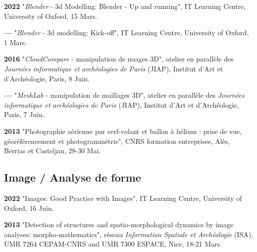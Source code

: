 \documentclass{article}
\newcommand{\fr}[1]{#1}       %
\newcommand{\en}[1]{}     %
\begin{document}
\textbf{2022 }
\fr{"\textit{Blender} - 3d Modelling: Blender - Up and running", IT Learning Centre, University of Oxford, 15 Mars.}
\en{"\textit{Blender} - 3D Modelling: Blender - Up and Running", IT Learning Centre, University of Oxford, March 15.}

\smallbreak
\textbf{--- }
\fr{"\textit{Blender} - 3d modelling: Kick-off", IT Learning Centre, University of Oxford, 1 Mars.}
\en{"\textit{Blender} - 3D Modelling: Kick-off", IT Learning Centre, University of Oxford, March 1.}

\smallbreak
\textbf{2016 }
\fr{"\textit{CloudCompare} - manipulation de nuages 3D", atelier en parallèle des \textit{Journées informatique et archéologies de Paris} (JIAP), Institut d'Art et d'Archéologie, Paris, 8 Juin.}
\en{"\textit{CloudCompare} - 3D Cloud Manipulation", parallel workshop at the \textit{Computer and Archaeology Days of Paris} (JIAP), Institute of Art and Archaeology, Paris, June 8.}

\smallbreak
\textbf{--- }
\fr{"\textit{MeshLab} - manipulation de maillages 3D", atelier en parallèle des \textit{Journées informatique et archéologies de Paris} (JIAP), Institut d'Art et d'Archéologie, Paris, 7 Juin.}
\en{"\textit{MeshLab} - 3D Mesh Manipulation", parallel workshop at the \textit{Computer and Archaeology Days of Paris} (JIAP), Institute of Art and Archaeology, Paris, June 7.}

\smallbreak
\textbf{2013 }
\fr{"Photographie aérienne par cerf-volant et ballon à hélium : prise de vue, géoréférencement et photogrammétrie", CNRS formation entreprises, Alès, Berrias et Casteljau, 28-30 Mai.}
\en{"Kite and Helium Balloon Aerial Photography: Shooting, Georeferencing, and Photogrammetry", CNRS Corporate Training, Alès, Berrias and Casteljau, May 28-30.}

\smallbreak

\subsection*{\fr{Image / Analyse de forme}\en{Image / Shape Analysis}}

\textbf{2022 }
\fr{"Images: Good Practice with Images", IT Learning Centre, University of Oxford, 16 Juin.}
\en{"Images: Good Practice with Images", IT Learning Centre, University of Oxford, June 16.}

\smallbreak
\textbf{2013 }
\fr{"Detection of structures and spatio-morphological dynamics by image analyses: morpho-mathematics", réseau \textit{Information Spatiale et Archéologie} (ISA), UMR 7264 CEPAM-CNRS and UMR 7300 ESPACE, Nice, 18-21 Mars.}
\en{"Detection of Structures and Spatio-Morphological Dynamics by Image Analysis: Morpho-Mathematics", Spatial Information and Archaeology Network (ISA), UMR 7264 CEPAM-CNRS and UMR 7300 ESPACE, Nice, March 18-21.}
\end{document}
